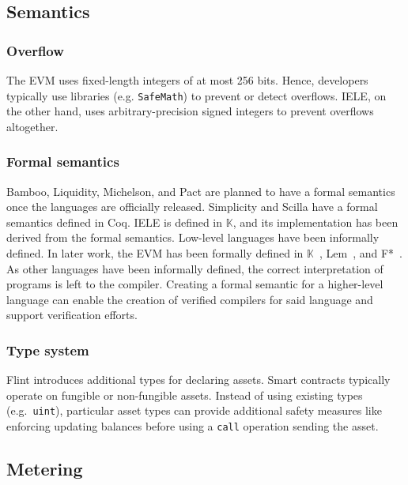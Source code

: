 \subsection{Semantics}
\subsubsection{Overflow}
The EVM uses fixed-length integers of at most 256 bits.
Hence, developers typically use libraries (e.g. \texttt{SafeMath}) to prevent or detect overflows.
IELE, on the other hand, uses arbitrary-precision signed integers to prevent overflows altogether.

\subsubsection{Formal semantics}
Bamboo, Liquidity, Michelson, and Pact are planned to have a formal semantics once the languages are officially released.  Simplicity and Scilla have a formal semantics defined in Coq. IELE is defined in $\mathbb{K}$, and its implementation has been derived from the formal semantics.
Low-level languages have been informally defined. In later work, the EVM has been formally defined in $\mathbb{K}$~\cite{Hildenbrandt2017}, Lem~\cite{Hirai2017}, and F*~\cite{Grishchenko2018}.
As other languages have been informally defined, the correct interpretation of programs is left to the compiler. Creating a formal semantic for a higher-level language can enable the creation of verified compilers for said language and support verification efforts.

\subsubsection{Type system}
Flint introduces additional types for declaring assets. Smart contracts typically operate on fungible or non-fungible assets. Instead of using existing types (e.g.\ \texttt{uint}), particular asset types can provide additional safety measures like enforcing updating balances before using a \texttt{call} operation sending the asset.


\subsection{Metering}

